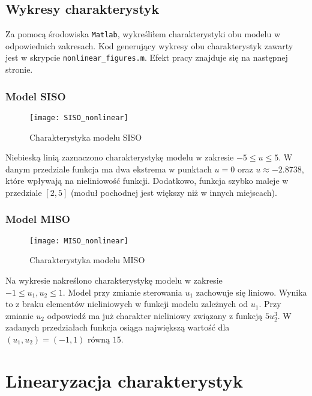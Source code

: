 \documentclass[11pt,a4paper]{article}
\begin{document}
\subsection{Wykresy charakterystyk}
\indent \indent Za pomocą środowiska \texttt{Matlab}, wykreśliłem charakterystyki obu modelu w odpowiednich zakresach. Kod generujący wykresy obu charakterystyk 
zawarty jest w skrypcie \texttt{nonlinear\_figures.m}. Efekt pracy znajduje się na następnej stronie. 

\newpage
\subsubsection{Model SISO}

\begin{figure}[h]
\texttt{[image: SISO\_nonlinear]}
\caption{Charakterystyka modelu SISO}
\end{figure}

Niebieską linią zaznaczono charakterystykę modelu w zakresie $-5 \le u \le 5$. W danym przedziale funkcja ma dwa ekstrema w punktach $u = 0$ oraz $u \approx -2.8738$, które wpływają na nieliniowość funkcji. Dodatkowo, funkcja szybko maleje w przedziale $[2,5]$ (moduł pochodnej jest większy niż w innych miejscach).

\newpage
\subsubsection{Model MISO}

\begin{figure}[h]
\texttt{[image: MISO\_nonlinear]}
\caption{Charakterystyka modelu MISO}
\end{figure}

Na wykresie nakreślono charakterystykę modelu w zakresie \\$-1 \le u_{1},u_{2} \le 1$. Model przy zmianie sterowania $u_{1}$ zachowuje się liniowo. Wynika to z braku elementów nieliniowych w funkcji modelu zależnych od $u_{1}$. Przy zmianie $u_{2}$ odpowiedź ma już charakter nieliniowy związany z funkcją $5u_{2}^3$. W zadanych przedziałach funkcja osiąga największą wartość dla $(u_{1},u_{2}) = (-1,1)$ równą $15$.

\newpage

\section{Linearyzacja charakterystyk}\label{sec:Linearyzacja charakterystyk}
\end{document}
